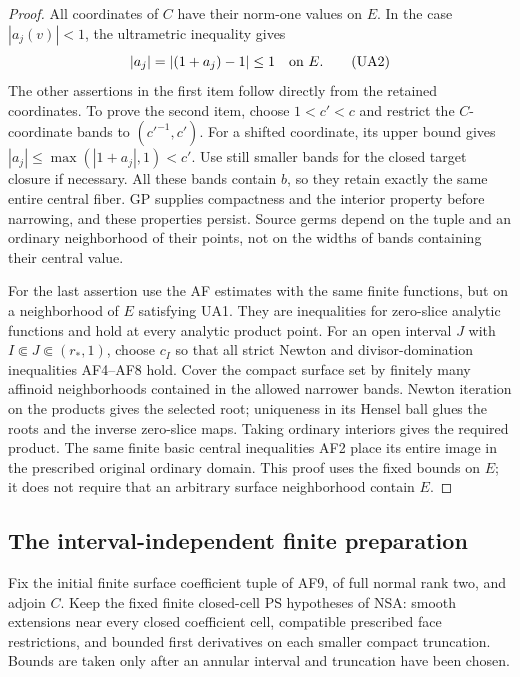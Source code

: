 \begin{proof}
All coordinates of \(C\) have their norm-one values on
\(E\).  In the case \(|a_j(v)|<1\), the ultrametric
inequality gives
\[
                |a_j|=|(1+a_j)-1|\leq1
                       \quad\hbox{on }E.
\tag{UA2}
\]
The other assertions in the first item follow directly
from the retained coordinates.  To prove the second item,
choose \(1<c'<c\) and restrict the \(C\)-coordinate bands
to \((c'^{-1},c')\).  For a shifted coordinate, its upper
bound gives \(|a_j|\leq\max(|1+a_j|,1)<c'\).  Use still
smaller bands for the closed target closure if necessary.
All these bands contain \(b\), so they retain exactly the
same entire central fiber.  GP supplies compactness and
the interior property before narrowing, and these properties
persist.  Source germs depend on the tuple and an ordinary
neighborhood of their points, not on the widths of bands
containing their central value.

For the last assertion use the AF estimates with the same
finite functions, but on a neighborhood of \(E\) satisfying
UA1.  They are inequalities for zero-slice analytic functions
and hold at every analytic product point.  For an open
interval \(J\) with \(I\Subset J\Subset(r_*,1)\), choose
\(c_I\) so that all strict Newton and divisor-domination
inequalities AF4--AF8 hold.  Cover the compact surface set
by finitely many affinoid neighborhoods contained in the
allowed narrower bands.  Newton iteration on the products
gives the selected root; uniqueness in its Hensel ball
glues the roots and the inverse zero-slice maps.  Taking
ordinary interiors gives the required product.  The same
finite basic central inequalities AF2 place its entire
image in the prescribed original ordinary domain.  This
proof uses the fixed bounds on \(E\); it does not require
that an arbitrary surface neighborhood contain \(E\).
\end{proof}

\subsection{The interval-independent finite preparation}

Fix the initial finite surface coefficient tuple of AF9,
of full normal rank two, and adjoin \(C\).  Keep the fixed
finite closed-cell PS hypotheses of NSA: smooth extensions
near every closed coefficient cell, compatible prescribed
face restrictions, and bounded first derivatives on each
smaller compact truncation.  Bounds are taken only after
an annular interval and truncation have been chosen.

